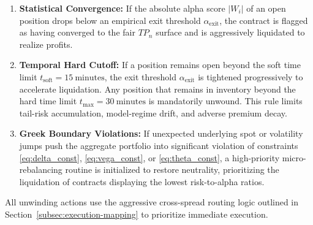 \documentclass[11pt, a4paper]{article}
\begin{document}
\begin{enumerate}
    \item \textbf{Statistical Convergence:} If the absolute alpha score $|W_i|$ of an open position drops below an empirical exit threshold $\alpha_{\text{exit}}$, the contract is flagged as having converged to the fair $TP_n$ surface and is aggressively liquidated to realize profits.
    \item \textbf{Temporal Hard Cutoff:} If a position remains open beyond the soft time limit $t_{\mathrm{soft}} = 15\ \mathrm{minutes}$, the exit threshold $\alpha_{\text{exit}}$ is tightened progressively to accelerate liquidation. Any position that remains in inventory beyond the hard time limit $t_{\max} = 30\ \mathrm{minutes}$ is mandatorily unwound. This rule limits tail-risk accumulation, model-regime drift, and adverse premium decay.
    \item \textbf{Greek Boundary Violations:} If unexpected underlying spot or volatility jumps push the aggregate portfolio into significant violation of constraints \eqref{eq:delta_const}, \eqref{eq:vega_const}, or \eqref{eq:theta_const}, a high-priority micro-rebalancing routine is initialized to restore neutrality, prioritizing the liquidation of contracts displaying the lowest risk-to-alpha ratios.
\end{enumerate}
All unwinding actions use the aggressive cross-spread routing logic outlined in Section~\ref{subsec:execution-mapping} to prioritize immediate execution.
\end{document}
